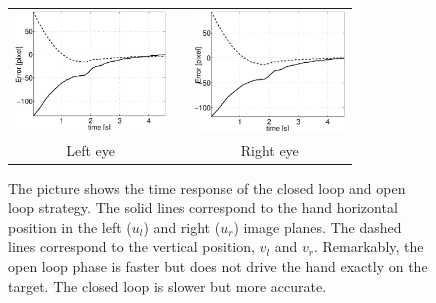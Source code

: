  \begin{figure}
  \begin{center}
	\begin{tabular}{ccc}
	  \parbox{50mm}{\includegraphics[width=40mm]{Figure/LeftEyeOpenClosedLoopTimeResponse.eps}}  & \hspace{2cm} &
	  \parbox{50mm}{\includegraphics[width=40mm]{Figure/RightEyeOpenClosedLoopTimeResponse.eps}}
	  \\
	  \parbox{50mm}{\centering Left eye } & \hspace{2cm} & \parbox{50mm}{\centering Right eye }
  \end{tabular}
\end{center}
\caption{The picture shows the time response of the closed loop and open loop strategy. The solid lines correspond to the hand horizontal position in the left ($u_l$) and right ($u_r$) image planes. The dashed lines correspond to the vertical position, $v_l$ and $v_r$. Remarkably, the open loop phase is faster but does not drive the hand exactly on the target. The closed loop is slower but more accurate.}\label{Fig:TimeResponseOpenClosedLoop}
  \end{figure}